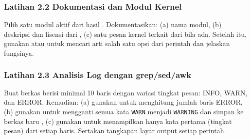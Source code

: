 \subsubsection*{Latihan 2.2 Dokumentasi dan Modul Kernel}
Pilih satu modul aktif dari hasil . Dokumentasikan: (a) nama modul, (b) deskripsi dan lisensi dari , (c) satu pesan kernel terkait dari  bila ada. Setelah itu, gunakan  atau  untuk mencari arti salah satu opsi dari perintah  dan jelaskan fungsinya.


\subsubsection*{Latihan 2.3 Analisis Log dengan grep/sed/awk}
Buat berkas  berisi minimal 10 baris dengan variasi tingkat pesan: INFO, WARN, dan ERROR. Kemudian: (a) gunakan  untuk menghitung jumlah baris ERROR, (b) gunakan  untuk mengganti semua kata \texttt{WARN} menjadi \texttt{WARNING} dan simpan ke berkas baru , (c) gunakan  untuk menampilkan hanya kata pertama (tingkat pesan) dari setiap baris. Sertakan tangkapan layar output setiap perintah.


%
